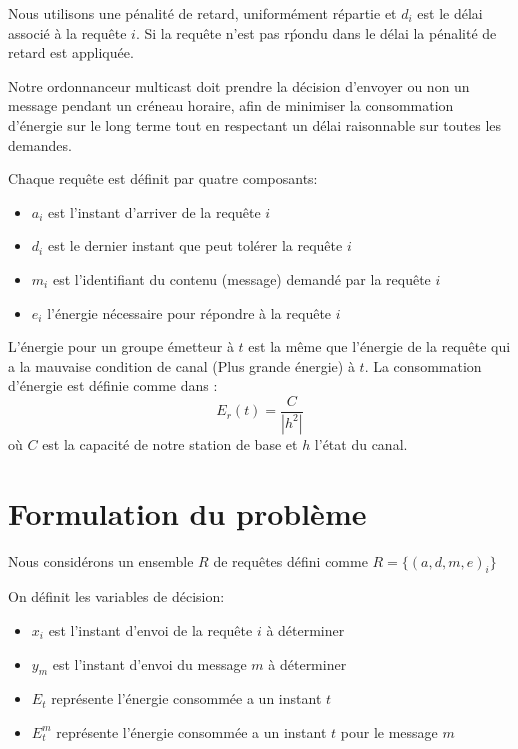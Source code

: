 \documentclass[runningheads]{llncs}
\begin{document}
Nous utilisons une pénalité de retard, uniformément répartie et 
$ d_i  $ est le d\'elai associé \`a la requête  $ i $. Si la requ\^ete 
n'est pas r\'pondu dans le délai la p\'enalit\'e de retard est appliqu\'ee.

Notre ordonnanceur multicast doit prendre la décision d'envoyer ou non 
un message pendant un créneau horaire, afin de minimiser la consommation 
d'énergie sur le long terme tout en respectant un délai raisonnable sur toutes les demandes.

Chaque requête est définit par quatre composants:
\begin{itemize}
    \item $a_i$ est l'instant d'arriver de la requête $i$
    \item $d_i$ est le dernier instant que peut tolérer la requête $i$
    \item $m_i$ est l'identifiant du contenu (message) demandé par la requête  $i$
    \item $e_i$ l'énergie nécessaire pour répondre à la requête $i$
\end{itemize} 

L'énergie pour un groupe émetteur à $ t $ est la même que l'énergie de la 
requête qui a la mauvaise condition de canal (Plus grande énergie) à $ t $.
La consommation d'énergie est définie comme dans \cite{huang2016}:
\begin{equation}
    E_r(t)  =  \frac {C} {| h ^ 2 |}  
\end{equation}
o\`u $C$ est la capacité  de notre station de base et $h$ l'état du canal.

\section{Formulation du problème}
Nous considérons un ensemble $R$ de requêtes défini comme 
$R = \{(a, d, m, e )_i\} $ 


On définit les variables de décision:
\begin{itemize}
    \item $x_i$ est l'instant d'envoi de la requête $i$ à  déterminer 
    \item $y_m$ est l'instant d'envoi du message  $m$ à  déterminer 
    \item $E_t$ représente l'énergie consommée a un instant $t$
    \item $E_t^m$ représente l'énergie consommée a un instant $t$ pour 
    le message $m$
\end{itemize}
\end{document}
